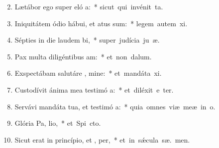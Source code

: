 \begin{flushleft}
\begin{enumerate}[leftmargin=*]
\setcounter{enumi}{1}

\item Lætábor ego super eló a:~* \mbox{sicut qui invénit  ta.}
\item Iniquitátem ódio hábui, et atus sum:~* \mbox{legem autem  xi.}
\item Sépties in die laudem  bi,~* \mbox{super judícia ju æ.}
\item Pax multa diligéntibus  am:~* \mbox{et non   dalum.}
\item Exspectábam salutáre , mine:~* \mbox{et mandáta  xi.}
\item Custodívit ánima mea testimó a:~* \mbox{et diléxit e ter.}
\item Servávi mandáta tua, et testimó a:~* \mbox{quia omnes viæ meæ in  o.}
\item Glória Pa,  lio,~* \mbox{et Spi cto.}
\item Sicut erat in princípio, et ,  per,~* \mbox{et in s\'{\ae}cula sæ. men.}


\end{enumerate}
\end{flushleft}


